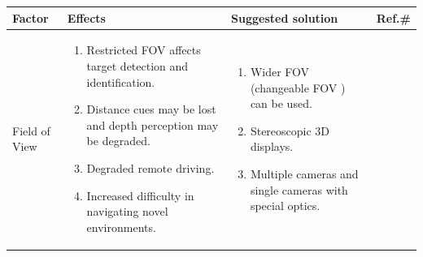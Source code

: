  \begin{longtable}{p{2.5cm} p{5cm} p{5cm} p{1cm}}
    \hline
      \textbf{Factor} & \textbf{Effects} & \textbf{Suggested solution} & \textbf{Ref.\#}\\           
            
        \hline 
        Field of View  &
           \begin{enumerate}
           \item Restricted FOV affects  target detection and identification.
           \item Distance cues may be lost and depth perception may be degraded.
           \item Degraded remote driving.
           \item Increased difficulty in navigating novel environments.
           \end{enumerate} &
            \begin{enumerate}
            \item Wider FOV (changeable FOV ) can be used. 
            \item Stereoscopic 3D displays.
            \item Multiple cameras and single cameras with special optics.
            \end{enumerate} &  \cite{Chen2014} \cite{smyth2000indirect} \cite{van2003image} \cite{Chen2007HumanPI} \cite{Suzuki2014} \\
        \hline
          

\end{longtable}
